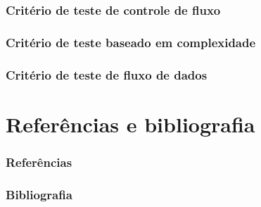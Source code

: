 \documentclass[utf8, usepdftitle=false, svgnames, color={table, fixpdftex, hyperref, fixinclude, xcdraw}, t, brazil]{beamer}
\begin{document}
		\section{Critério de teste de controle de fluxo}
		 

		\section{Critério de teste baseado em complexidade}
		 

		\section{Critério de teste de fluxo de dados}
		  


	\part{Referências e bibliografia}

		\section{Referências}
		

		\section{Bibliografia}
		
	

% 		
\end{document}
